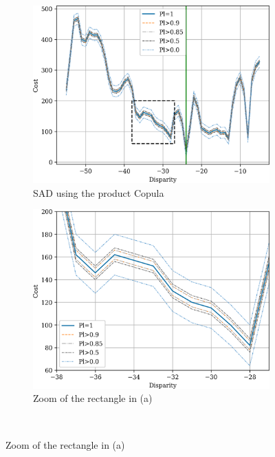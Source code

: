 \begin{figure}
    \centering
    \begin{subfigure}{0.48\linewidth}
        \centering
        \includegraphics[width=\linewidth]{Images/Chap_4/bel_independence_100_120.png}
        \caption{SAD using the product Copula}
        \label{fig:belief_independence}
    \end{subfigure}\hfill
    \begin{subfigure}{0.48\linewidth}
        \centering
        \includegraphics[width=\linewidth]{Images/Chap_4/bel_independence_100_120_zoom.png}
        \caption{Zoom of the rectangle in (a)}
        \label{fig:belief_independence_zoom}
    \end{subfigure}\\

\end{figure}
